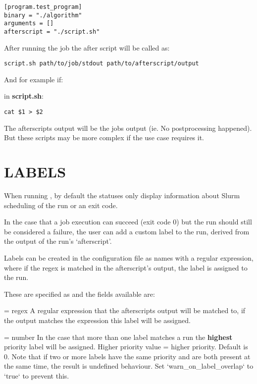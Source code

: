 \documentclass[a4paper,english]{article}
\begin{document}
\begin{adjustwidth}{18pt}{0pt}
            \begin{verbatim}
[program.test_program]
binary = "./algorithm"
arguments = []
afterscript = "./script.sh"
            \end{verbatim}

            After running the job the after script will be called as:

            \begin{verbatim}
script.sh path/to/job/stdout path/to/afterscript/output
            \end{verbatim}

            And for example if:

            in \textbf{script.sh}:
            \begin{verbatim}
cat $1 > $2
            \end{verbatim}

            The afterscripts output will be the jobs output (ie. No postprocessing happened).
            But these scripts may be more complex if the use case requires it.

    \section{LABELS}

      When running  , by default the statuses only display information
      about Slurm scheduling of the run or an exit code.

      In the case that a job execution can succeed (exit code 0) but the run should still
      be considered a failure, the user can add a custom label to the run, derived from
      the output of the run's `afterscript'.

      Labels can be created in the configuration file as names with a regular expression,
      where if the regex is matched in the afterscript's output, the label is assigned to the run.

      These are specified as  and the fields available are:

      \begin{Description}[Options]\setlength{\itemsep}{0cm}
          \item[\Opt{regex} = regex]
          A regular expression that the afterscripts output will be matched to,
          if the output matches the expression this label will be assigned.

          \item[\Opt{priority} = number]
          In the case that more than one label matches a run the \textbf{highest}
          priority label will be assigned.
          Higher priority value = higher priority.
          Default is 0. 
          Note that if two or more labels have the same priority and are both present 
          at the same time, the result is undefined behaviour. 
          Set `warn_on_label_overlap` to `true` to prevent this.


\end{Description}
\end{adjustwidth}
\end{document}
